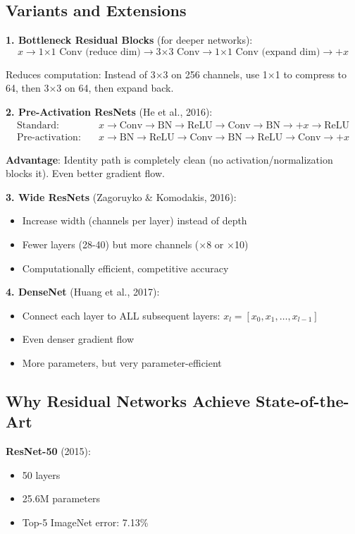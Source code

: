 \subsection{Variants and Extensions}

\textbf{1. Bottleneck Residual Blocks} (for deeper networks):
\[
x \to \text{1×1 Conv (reduce dim)} \to \text{3×3 Conv} \to \text{1×1 Conv (expand dim)} \to + x
\]

Reduces computation: Instead of 3×3 on 256 channels, use 1×1 to compress to 64, then 3×3 on 64, then expand back.

\textbf{2. Pre-Activation ResNets} (He et al., 2016):
\begin{align*}
\text{Standard:} \quad & x \to \text{Conv} \to \text{BN} \to \text{ReLU} \to \text{Conv} \to \text{BN} \to +x \to \text{ReLU} \\
\text{Pre-activation:} \quad & x \to \text{BN} \to \text{ReLU} \to \text{Conv} \to \text{BN} \to \text{ReLU} \to \text{Conv} \to +x
\end{align*}

\textbf{Advantage}: Identity path is completely clean (no activation/normalization blocks it). Even better gradient flow.

\textbf{3. Wide ResNets} (Zagoruyko \& Komodakis, 2016):
\begin{itemize}
\item Increase width (channels per layer) instead of depth
\item Fewer layers (28-40) but more channels ($\times$8 or $\times$10)
\item Computationally efficient, competitive accuracy
\end{itemize}

\textbf{4. DenseNet} (Huang et al., 2017):
\begin{itemize}
\item Connect each layer to ALL subsequent layers: $x_l = [x_0, x_1, \ldots, x_{l-1}]$
\item Even denser gradient flow
\item More parameters, but very parameter-efficient
\end{itemize}

\subsection{Why Residual Networks Achieve State-of-the-Art}

\textbf{ResNet-50} (2015):
\begin{itemize}
\item 50 layers
\item 25.6M parameters
\item Top-5 ImageNet error: 7.13\%
\end{itemize}

